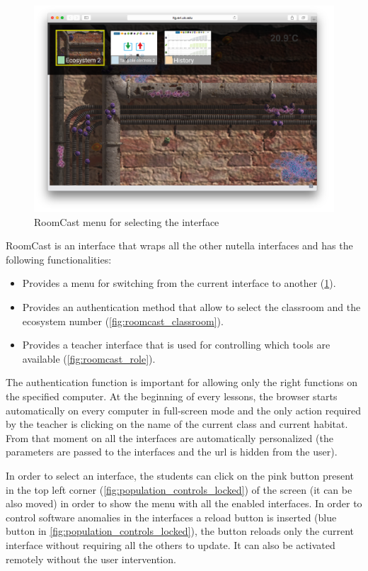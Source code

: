 \begin{figure}
\centering
\includegraphics[width=4.5in]{images/room-cast-menu.png}
\caption{RoomCast menu for selecting the interface}
\label{fig:roomcast_menu}
\end{figure}

RoomCast is an interface that wraps all the other nutella interfaces and has the following functionalities:
\begin{itemize}
\item Provides a menu for switching from the current interface to another (\ref{fig:roomcast_menu}).
\item Provides an authentication method that allow to select the classroom and the ecosystem number (\ref{fig:roomcast_classroom}).
\item Provides a teacher interface that is used for controlling which tools are available (\ref{fig:roomcast_role}).
\end{itemize}
The authentication function is important for allowing only the right functions on the specified computer. At the beginning of every lessons, the browser starts automatically on every computer in full-screen mode and the only action required by the teacher is clicking on the name of the current class and current habitat. From that moment on all the interfaces are automatically personalized (the parameters are passed to the interfaces and the url is hidden from the user).

In order to select an interface, the students can click on the pink button present in the top left corner (\ref{fig:population_controls_locked}) of the screen (it can be also moved) in order to show the menu with all the enabled interfaces. In order to control software anomalies in the interfaces a reload button is inserted (blue button in \ref{fig:population_controls_locked}), the button reloads only the current interface without requiring all the others to update. It can also be activated remotely without the user intervention.

